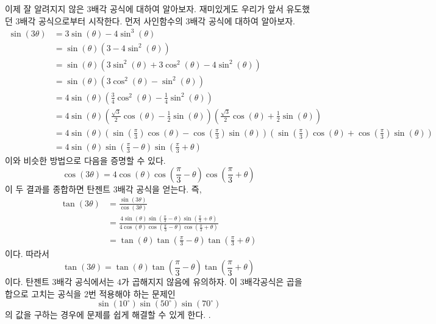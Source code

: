 \documentclass[11pt, a4paper]{book}
\begin{document}
 이제 잘 알려지지 않은 3배각 공식에 대하여 알아보자. 재미있게도 우리가 앞서 유도했던 3배각 공식으로부터 시작한다. 먼저 사인함수의 3배각 공식에 대하여 알아보자.
 \begin{align*}
 	\sin(3\theta) & = 3 \sin(\theta) - 4\sin^{3}(\theta) \\
 				  & = \sin(\theta)(3-4 \sin^{2}(\theta)) \\
 				  & = \sin(\theta)(3\sin^{2}(\theta)+ 3\cos^{2}(\theta)-4\sin^{2}(\theta))\\
 				  & = \sin(\theta)(3\cos^{2}(\theta)-\sin^{2}(\theta))\\
 				  & = 4\sin(\theta)\left(\frac{3}{4}\cos^{2}(\theta) -\frac{1}{4}\sin^{2}(\theta)\right)\\
 				  & = 4\sin(\theta)\left(\frac{\sqrt{3}}{2}\cos(\theta)-\frac{1}{2}\sin(\theta)\right)\left(\frac{\sqrt{3}}{2}\cos(\theta)+\frac{1}{2}\sin(\theta)\right)\\
 				  &= 4\sin(\theta)\left(\sin\left(\frac{\pi}{3}\right)\cos(\theta)- \cos\left(\frac{\pi}{3}\right)\sin(\theta)\right)\left(\sin\left(\frac{\pi}{3}\right)\cos(\theta)+ \cos\left(\frac{\pi}{3}\right)\sin(\theta)\right)\\
 				  & = 4 \sin(\theta)\sin \left(\frac{\pi}{3}-\theta\right)\sin \left(\frac{\pi}{3}+\theta\right)
 \end{align*}
이와 비슷한 방법으로 다음을 증명할 수 있다.
\begin{equation}\label{eqn:mult3}
\cos(3\theta) = 4 \cos(\theta)\cos \left(\frac{\pi}{3}-\theta\right)\cos \left(\frac{\pi}{3}+\theta\right)
\end{equation}
이 두 결과를 종합하면 탄젠트 3배각 공식을 얻는다. 즉,
\begin{align*}
	\tan(3\theta) &=\frac{\sin(3\theta)}{\cos(3\theta)} \\
	&=\frac{4 \sin(\theta)\sin \left(\frac{\pi}{3}-\theta\right)\sin \left(\frac{\pi}{3}+\theta\right)}{ 4 \cos(\theta)\cos \left(\frac{\pi}{3}-\theta\right)\cos \left(\frac{\pi}{3}+\theta\right)} \\
	& = \tan(\theta)\tan \left(\frac{\pi}{3}-\theta\right)\tan \left(\frac{\pi}{3}+\theta\right)
\end{align*}
이다. 따라서 
\[
\tan(3\theta) = \tan(\theta)\tan \left(\frac{\pi}{3}-\theta\right)\tan \left(\frac{\pi}{3}+\theta\right)
\]
이다.
탄젠트 3배각 공식에서는 $4$가 곱해지지 않음에 유의하자. 이 3배각공식은 곱을 합으로 고치는 공식을 2번 적용해야 하는 문제인\phantom{(문재인 대통령 만세)}
\[
\sin(10^{\circ})\sin(50^{\circ})\sin(70^{\circ})
\]
의 값을 구하는 경우에 문제를 쉽게 해결할 수 있게 한다.    . 
 
\end{document}

